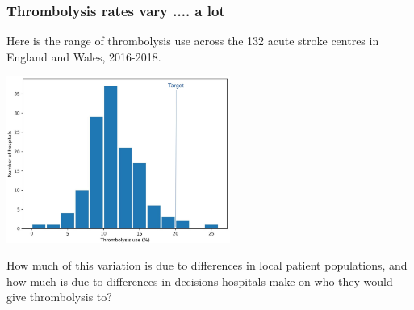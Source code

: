 \begin{frame}
\frametitle{Thrombolysis rates vary .... a lot}
Here is the range of thrombolysis use across the 132 acute stroke centres in England and Wales, 2016-2018.
\begin{center}
\includegraphics[width=0.55\textwidth]{./images/thrombolysis_by_hospital}
\end{center}

How much of this variation is due to differences in local patient populations, and how much is due to differences in decisions hospitals make on who they would give thrombolysis to?
\end{frame}